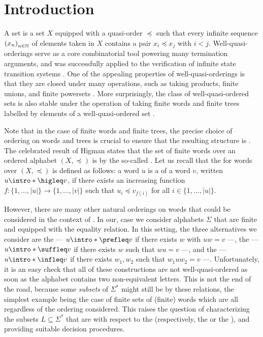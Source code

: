 \section{Introduction}
\label{introduction:sec}

A  set is a set $X$ equipped with a quasi-order
$\preceq$ such that every infinite sequence $\seqof{x_n}$ of elements taken in
$X$ contains a pair $x_i \preceq x_j$ with $i < j$. Well-quasi-orderings serve
as a core combinatorial tool powering many termination arguments, and was
successfully applied to the verification of infinite state transition systems
\cite{ABDU96,ABDU98}. One of the appealing properties of well-quasi-orderings
is that they are closed under many operations, such as taking products, finite
unions, and finite powersets \cite{SCSC12}. More surprisingly, the class of
well-quasi-ordered sets is also stable under the operation of taking finite
words and finite trees labelled by elements of a well-quasi-ordered set
\cite{HIG52,KRU72}.

Note that in the case of finite words and finite trees, the precise choice of
ordering on words and trees is crucial to ensure that the resulting structure
is . The celebrated result of Higman states that the set
of finite words over an ordered alphabet $(X, \preceq)$ is
 by the so-called 
\cite{HIG52}. Let us recall that the  for words over $(X,
\preceq)$ is defined as follows: a word $u$ is a  of a word $v$,
written $u \intro*\higleq v$,
if there exists an increasing function $f \colon \{1, \ldots, |u|\} \to \{1,
\ldots, |v|\}$ such that $u_i \preceq v_{f(i)}$ for all $i \in \{1, \ldots,
|u|\}$.

However, there are many other natural orderings on words that could be
considered in the context of . In our, case we
consider alphabets $\Sigma$ that are finite and equipped with the equality
relation. In this setting, the three alternatives we consider are the
 --- $u \intro*\prefleq v$ if there exists $w$ with $uw
= v$ ---, the  --- $u \intro*\suffleq v$ if there exists
$w$ such that $wu = v$ ---, and the  --- $u
\intro*\infleq v$ if there exists $w_1,w_2$ such that $w_1 u w_2 = v$ ---.
Unfortunately, it is an easy check that all of these constructions are not
well-quasi-ordered as soon as the alphabet contains two non-equivalent letters.
This is not the end of the road, because some \emph{subsets} of $\Sigma^*$
might still be  by these relations, the simplest example
being the case of finite sets of (finite) words which are all
 regardless of the ordering considered. This raises the
question of characterizing the subsets $L \subseteq \Sigma^*$ that are
 with respect to the  (respectively,
the  or the ), and providing suitable
decision procedures.


